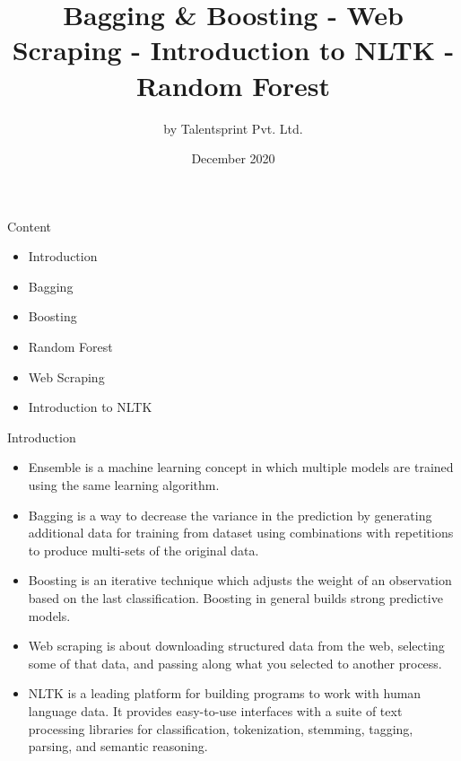 \documentclass{beamer}
\title{Bagging \& Boosting - Web Scraping - Introduction to NLTK - Random Forest}
\author{by Talentsprint Pvt. Ltd.}
\date{December 2020}
\begin{document}
\maketitle
\begin{frame}{Content}
	\begin{itemize}
		\item Introduction
		\item Bagging
		\item Boosting
		\item Random Forest
		\item Web Scraping
		\item Introduction to NLTK
	\end{itemize}
\end{frame}

\begin{frame}{Introduction}
	\begin{flushleft}
		\begin{itemize}
			\item Ensemble is a machine learning concept in which multiple models are trained using the same learning algorithm.
			\item Bagging is a way to decrease the variance in the prediction by generating additional data for training from dataset using combinations with repetitions to produce multi-sets of the original data. 
			\item Boosting is an iterative technique which adjusts the weight of an observation based on the last classification. Boosting in general builds strong predictive models.
			\item Web scraping is about downloading structured data from the web, selecting some of that data, and passing along what you selected to another process.
			\item NLTK is a leading platform for building programs to work with human language data. It provides easy-to-use interfaces with a suite of text processing libraries for classification, tokenization, stemming, tagging, parsing, and semantic reasoning.
		\end{itemize}
	\end{flushleft}
\end{frame}
\end{document}
